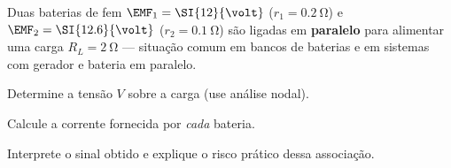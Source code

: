 \blocodesafio
\begin{questao}[4]{}

Duas baterias de fem $\EMF_1 = \SI{12}{\volt}$ ($r_1=\SI{0.2}{\ohm}$) e
$\EMF_2 = \SI{12.6}{\volt}$ ($r_2=\SI{0.1}{\ohm}$) são ligadas em
\textbf{paralelo} para alimentar uma carga $R_L = \SI{2}{\ohm}$ --- situação
comum em bancos de baterias e em sistemas com gerador e bateria em paralelo.


\begin{itensq}
\item Determine a tensão $V$ sobre a carga (use análise nodal).
\item Calcule a corrente fornecida por \emph{cada} bateria.
\item Interprete o sinal obtido e explique o risco prático dessa associação.
\end{itensq}


\end{questao}

